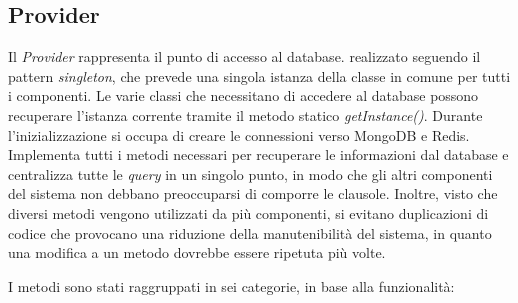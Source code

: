 \subsection{Provider\label{sec:provider}}

Il \emph{Provider} rappresenta il punto di accesso al database. \upe realizzato seguendo il pattern \emph{singleton}, che prevede una singola istanza della classe in comune per tutti i componenti. Le varie classi che necessitano di accedere al database possono recuperare l'istanza corrente tramite il metodo statico \emph{getInstance()}. Durante l'inizializzazione si occupa di creare le connessioni verso MongoDB e Redis. Implementa tutti i metodi necessari per recuperare le informazioni dal database e centralizza tutte le \emph{query} in un singolo punto, in modo che gli altri componenti del sistema non debbano preoccuparsi di comporre le clausole. Inoltre, visto che diversi metodi vengono utilizzati da più componenti, si evitano duplicazioni di codice che provocano una riduzione della manutenibilità del sistema, in quanto una modifica a un metodo dovrebbe essere ripetuta più volte.

I metodi sono stati raggruppati in sei categorie, in base alla funzionalità:

